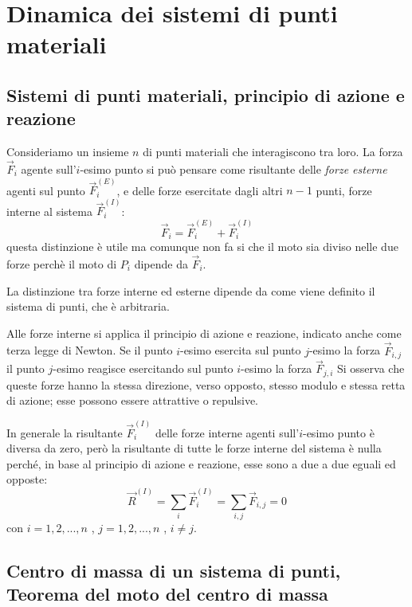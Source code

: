 \documentclass[class=book, crop=false, oneside, 12pt]{standalone}
\begin{document}
\chapter{Dinamica dei sistemi di punti materiali}

\section{Sistemi di punti materiali, principio di azione e reazione}

Consideriamo un insieme \(n\) di punti materiali che interagiscono tra loro.\newline
La forza \(\overrightarrow{F}_i\) agente sull'\(i\)-esimo punto si può pensare come risultante delle \emph{forze esterne}
agenti sul punto \(\overrightarrow{F}_i^{(E)}\), e delle forze esercitate dagli altri \(n-1\) punti, forze interne al sistema \(\overrightarrow{F}_i^{(I)}\):
\begin{equation}
    \overrightarrow{F}_i = \overrightarrow{F}_i^{(E)} + \overrightarrow{F}_i^{(I)}
\end{equation}
questa distinzione è utile ma comunque non fa si che il moto sia diviso nelle due forze perchè il moto di \(P_i\) dipende da \(\overrightarrow{F}_i\).

La distinzione tra forze interne ed esterne dipende da come viene definito il sistema di punti, che è arbitraria.

Alle forze interne si applica il principio di azione e reazione, indicato anche come terza legge di Newton. 
Se il punto \(i\)-esimo esercita sul punto \(j\)-esimo la forza \(\overrightarrow{F}_{i,j}\) il punto \(j\)-esimo reagisce esercitando sul punto \(i\)-esimo la forza \(\overrightarrow{F}_{j,i}\)
Si osserva che queste forze hanno la stessa direzione, verso opposto, stesso modulo e stessa retta di azione; esse possono essere attrattive o repulsive. 

In generale la risultante \(\overrightarrow{F}_i^{(I)}\) delle forze interne agenti sull'\(i\)-esimo punto è diversa da zero, però la risultante di tutte le forze interne del sistema è nulla perché, in base al principio di azione e reazione, esse sono a due a due eguali ed opposte:
\begin{equation}
    \overrightarrow{R}^{(I)} = \sum_i \overrightarrow{F}_i^{(I)} = \sum_{i,j} \overrightarrow{F}_{i,j} = 0 
\end{equation}
con \(i  = 1,2,...,n\) , \(j = 1,2,...,n\) , \(i \neq j\).

\section{Centro di massa di un sistema di punti, Teorema del moto del centro di massa}
\end{document}
